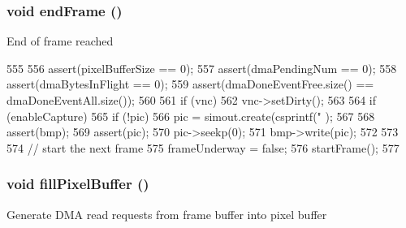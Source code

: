 \label{classHDLcd_ae86db13e164e3134cde1780b881b5a2b}
\hypertarget{classHDLcd_a275cb0fc5850b339346d533d2e65aaa8}{
\subsubsection[{endFrame}]{\setlength{\rightskip}{0pt plus 5cm}void endFrame ()}}
\label{classHDLcd_a275cb0fc5850b339346d533d2e65aaa8}
End of frame reached 


\begin{DoxyCode}
555                 {
556     assert(pixelBufferSize == 0);
557     assert(dmaPendingNum == 0);
558     assert(dmaBytesInFlight == 0);
559     assert(dmaDoneEventFree.size() == dmaDoneEventAll.size());
560 
561     if (vnc)
562         vnc->setDirty();
563 
564     if (enableCapture) {
565         if (!pic)
566             pic = simout.create(csprintf("%
      );
567 
568         assert(bmp);
569         assert(pic);
570         pic->seekp(0);
571         bmp->write(pic);
572     }
573 
574     // start the next frame
575     frameUnderway = false;
576     startFrame();
577 }
\end{DoxyCode}
\hypertarget{classHDLcd_a8b6bacaad93cdca1a4f0697be74311c1}{
\subsubsection[{fillPixelBuffer}]{\setlength{\rightskip}{0pt plus 5cm}void fillPixelBuffer ()}}
\label{classHDLcd_a8b6bacaad93cdca1a4f0697be74311c1}
Generate DMA read requests from frame buffer into pixel buffer 


